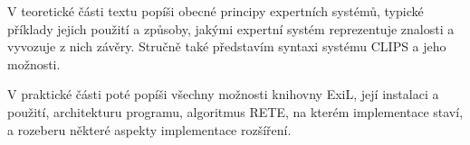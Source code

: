V teoretické části textu popíši obecné principy expertních systémů, typické
příklady jejich použití a způsoby, jakými expertní systém reprezentuje znalosti
a vyvozuje z nich závěry. Stručně také představím syntaxi systému CLIPS a jeho
možnosti.

V praktické části poté popíši všechny možnosti knihovny ExiL, její instalaci a
použití, architekturu programu, algoritmus RETE, na kterém implementace staví, a
rozeberu některé aspekty implementace rozšíření.
